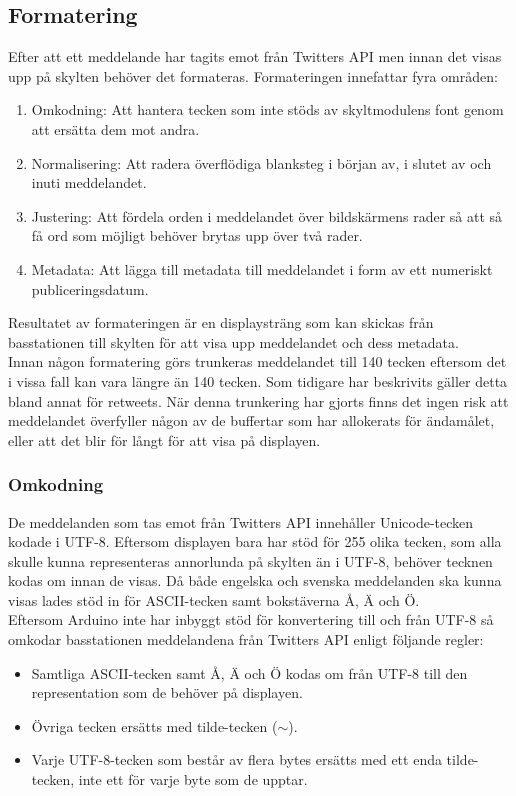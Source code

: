 \documentclass[a4paper,11pt]{article}
\begin{document}
\subsection{Formatering}
Efter att ett meddelande har tagits emot från Twitters API men innan det visas upp på skylten behöver det formateras. Formateringen innefattar fyra områden:
	\begin{enumerate}
    	\item Omkodning: Att hantera tecken som inte stöds av skyltmodulens font genom att ersätta dem mot andra.
    	\item Normalisering: Att radera överflödiga blanksteg i början av, i slutet av och inuti meddelandet.
    	\item Justering: Att fördela orden i meddelandet över bildskärmens rader så att så få ord som möjligt behöver brytas upp över två rader.
    	\item Metadata: Att lägga till metadata till meddelandet i form av ett numeriskt publiceringsdatum.
	\end{enumerate}

Resultatet av formateringen är en displaysträng som kan skickas från basstationen till skylten för att visa upp meddelandet och dess metadata.\\

Innan någon formatering görs trunkeras meddelandet till 140 tecken eftersom det i vissa fall kan vara längre än 140 tecken. Som tidigare har beskrivits gäller detta bland annat för retweets. När denna trunkering har gjorts finns det ingen risk att meddelandet överfyller någon av de buffertar som har allokerats för ändamålet, eller att det blir för långt för att visa på displayen.

\subsubsection{Omkodning}
De meddelanden som tas emot från Twitters API innehåller Unicode-tecken kodade i UTF-8. Eftersom displayen bara har stöd för 255 olika tecken, som alla skulle kunna representeras annorlunda på skylten än i UTF-8, behöver tecknen kodas om innan de visas. Då både engelska och svenska meddelanden ska kunna visas lades stöd in för ASCII-tecken samt bokstäverna Å, Ä och Ö.\\

Eftersom Arduino inte har inbyggt stöd för konvertering till och från UTF-8 så omkodar basstationen meddelandena från Twitters API enligt följande regler:
	\begin{itemize}
    	\item Samtliga ASCII-tecken samt Å, Ä och Ö kodas om från UTF-8 till den representation som de behöver på displayen.
    	\item Övriga tecken ersätts med tilde-tecken ($\sim$).
    	\item Varje UTF-8-tecken som består av flera bytes ersätts med ett enda tilde-tecken, inte ett för varje byte som de upptar.
	\end{itemize}
\end{document}
